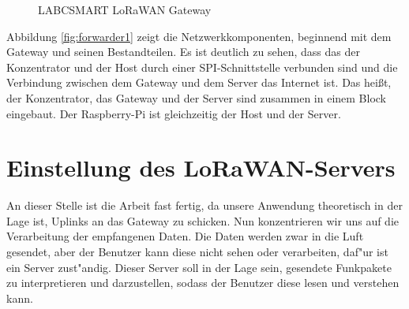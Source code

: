 \begin{figure}[h!]
	\centering
	\caption{LABCSMART LoRaWAN Gateway}
\end{figure}


Abbildung \ref{fig:forwarder1} zeigt die Netzwerkkomponenten, beginnend
mit dem Gateway und seinen Bestandteilen. Es ist deutlich zu sehen, dass
das der Konzentrator und der Host durch einer SPI-Schnittstelle verbunden
sind und die Verbindung zwischen dem Gateway und dem Server das Internet
ist. Das hei\ss{}t, der Konzentrator, das Gateway und der
Server sind zusammen in einem Block eingebaut. Der Raspberry-Pi ist
gleichzeitig der Host und der Server. 

\section{Einstellung des LoRaWAN-Servers}\label{server}

An dieser Stelle ist die Arbeit fast fertig, da unsere Anwendung
theoretisch in der Lage ist, Uplinks an das Gateway zu schicken. Nun
konzentrieren wir uns auf die Verarbeitung der empfangenen Daten. Die
Daten werden zwar in die Luft gesendet, aber der Benutzer kann diese
nicht sehen oder verarbeiten, daf"ur ist ein Server zust"andig. Dieser
Server soll in der Lage sein, gesendete Funkpakete zu interpretieren 
und darzustellen, sodass der Benutzer diese lesen und verstehen kann. 

